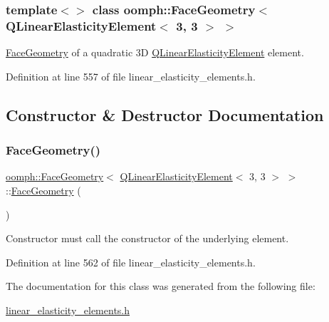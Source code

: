 \subsubsection*{template$<$$>$\newline
class oomph\+::\+Face\+Geometry$<$ Q\+Linear\+Elasticity\+Element$<$ 3, 3 $>$ $>$}

\hyperlink{classoomph_1_1FaceGeometry}{Face\+Geometry} of a quadratic 3D \hyperlink{classoomph_1_1QLinearElasticityElement}{Q\+Linear\+Elasticity\+Element} element. 

Definition at line 557 of file linear\+\_\+elasticity\+\_\+elements.\+h.



\subsection{Constructor \& Destructor Documentation}
\mbox{\label{classoomph_1_1FaceGeometry_3_01QLinearElasticityElement_3_013_00_013_01_4_01_4_aa2ddda4b4afce106d71f4f55a2d5ad12}} 
\subsubsection{\texorpdfstring{Face\+Geometry()}{FaceGeometry()}}
{\footnotesize\ttfamily \hyperlink{classoomph_1_1FaceGeometry}{oomph\+::\+Face\+Geometry}$<$ \hyperlink{classoomph_1_1QLinearElasticityElement}{Q\+Linear\+Elasticity\+Element}$<$ 3, 3 $>$ $>$\+::\hyperlink{classoomph_1_1FaceGeometry}{Face\+Geometry} (\begin{DoxyParamCaption}{ }\end{DoxyParamCaption})\hspace{0.3cm}{\ttfamily [inline]}}



Constructor must call the constructor of the underlying element. 



Definition at line 562 of file linear\+\_\+elasticity\+\_\+elements.\+h.



The documentation for this class was generated from the following file\+:\begin{DoxyCompactItemize}
\item 
\hyperlink{linear__elasticity__elements_8h}{linear\+\_\+elasticity\+\_\+elements.\+h}\end{DoxyCompactItemize}
